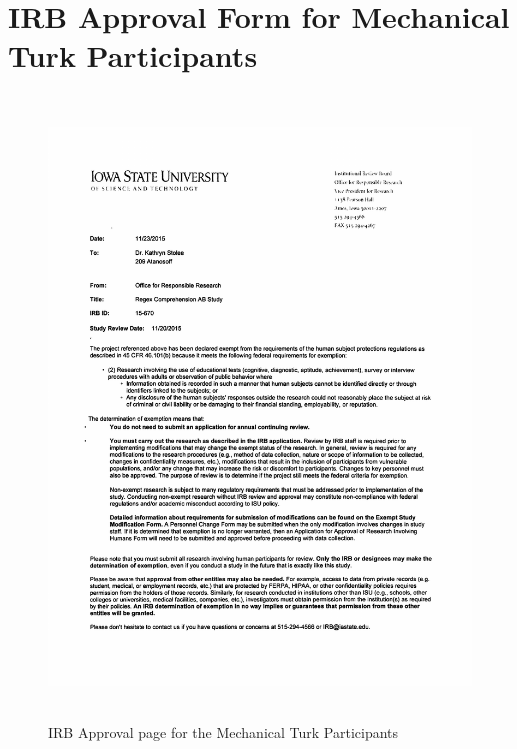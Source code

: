 \section*{IRB Approval Form for Mechanical Turk Participants}
\label{app:MTIRB}

\begin{figure}[!htbp]
   \centering
       \includegraphics[page=1, height=16.5cm,keepaspectratio]{nontex/appendix/15-670_Approved}
 \caption{IRB Approval page for the Mechanical Turk Participants}
 \label{fig:MTIRB}
\end{figure}

